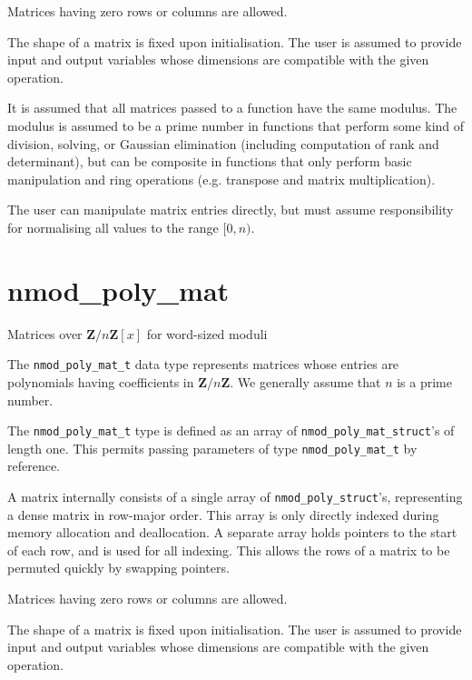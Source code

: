 \documentclass[a4paper,10pt]{book}
\newcommand{\Z}{\mathbf{Z}}%
\newcommand{\code}{\lstinline}
\begin{document}
{{Matrices having zero rows or columns are allowed.

The shape of a matrix is fixed upon initialisation.
The user is assumed to provide input and output variables
whose dimensions are compatible with the given operation.

It is assumed that all matrices passed to a function have the same modulus.
The modulus is assumed to be a prime number in functions that
perform some kind of division, solving, or Gaussian elimination
(including computation of rank and determinant),
but can be composite in functions that only perform basic manipulation
and ring operations (e.g. transpose and matrix multiplication).

The user can manipulate matrix entries directly, but must
assume responsibility for normalising all values to the range $[0, n)$.




\chapter{nmod\_poly\_mat}
\epigraph{Matrices over $\Z / n \Z[x]$ for word-sized moduli}{}

The \code{nmod_poly_mat_t} data type represents matrices whose
entries are polynomials having coefficients in $\Z / n \Z$.
We generally assume that $n$ is a prime number.

The \code{nmod_poly_mat_t} type is defined as an array of
\code{nmod_poly_mat_struct}'s of length one.
This permits passing parameters of type \code{nmod_poly_mat_t}
by reference.

A matrix internally consists of a single array
of \code{nmod_poly_struct}'s, representing a dense matrix in
row-major order. This array is only directly indexed
during memory allocation and deallocation. A separate array
holds pointers to the start of each row, and is used for all
indexing. This allows the rows of a matrix to be permuted
quickly by swapping pointers.

Matrices having zero rows or columns are allowed.

The shape of a matrix is fixed upon initialisation.
The user is assumed to provide input and output variables
whose dimensions are compatible with the given operation.

}}
\end{document}
